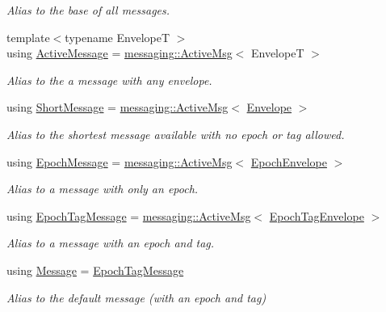 \begin{DoxyCompactItemize}
\begin{DoxyCompactList}\small\item\em Alias to the base of all messages. \end{DoxyCompactList}\item 
{\footnotesize template$<$typename EnvelopeT $>$ }\\using \hyperlink{namespacevt_a00eb67bd138395b6a4f744fab3fa0678}{Active\+Message} = \hyperlink{structvt_1_1messaging_1_1_active_msg}{messaging\+::\+Active\+Msg}$<$ EnvelopeT $>$
\begin{DoxyCompactList}\small\item\em Alias to the a message with any envelope. \end{DoxyCompactList}\item 
using \hyperlink{namespacevt_a1125ac1da6c0bbf141e0ea0739d7602d}{Short\+Message} = \hyperlink{structvt_1_1messaging_1_1_active_msg}{messaging\+::\+Active\+Msg}$<$ \hyperlink{namespacevt_aa9c8cc094b5361482021d63012987814}{Envelope} $>$
\begin{DoxyCompactList}\small\item\em Alias to the shortest message available with no epoch or tag allowed. \end{DoxyCompactList}\item 
using \hyperlink{namespacevt_ad67368ffae52d7325002586b41bb150e}{Epoch\+Message} = \hyperlink{structvt_1_1messaging_1_1_active_msg}{messaging\+::\+Active\+Msg}$<$ \hyperlink{namespacevt_af71a025689a3da5037785b53a7a8e78c}{Epoch\+Envelope} $>$
\begin{DoxyCompactList}\small\item\em Alias to a message with only an epoch. \end{DoxyCompactList}\item 
using \hyperlink{namespacevt_a4ccc13b06bff8a4a35426a1a082a95a9}{Epoch\+Tag\+Message} = \hyperlink{structvt_1_1messaging_1_1_active_msg}{messaging\+::\+Active\+Msg}$<$ \hyperlink{namespacevt_af23b58014ced6898422213a0e5e6a27a}{Epoch\+Tag\+Envelope} $>$
\begin{DoxyCompactList}\small\item\em Alias to a message with an epoch and tag. \end{DoxyCompactList}\item 
using \hyperlink{namespacevt_a3a3ddfef40b4c90915fa43cdd5f129ea}{Message} = \hyperlink{namespacevt_a4ccc13b06bff8a4a35426a1a082a95a9}{Epoch\+Tag\+Message}
\begin{DoxyCompactList}\small\item\em Alias to the default message (with an epoch and tag) \end{DoxyCompactList}\item 

\end{DoxyCompactItemize}
